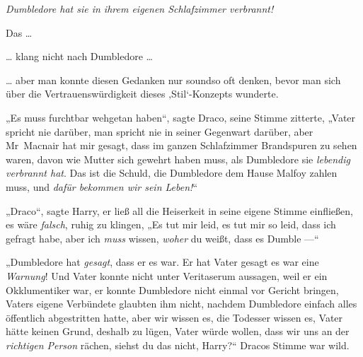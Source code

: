 \emph{Dumbledore hat sie in ihrem eigenen Schlafzimmer verbrannt!}

Das …

… klang nicht nach Dumbledore …

… aber man konnte diesen Gedanken nur soundso oft denken, bevor man sich über die Vertrauenswürdigkeit dieses ‚Stil‘-Konzepts wunderte.

„Es muss furchtbar wehgetan haben“, sagte Draco, seine Stimme zitterte,
„Vater spricht nie darüber, man spricht nie in seiner Gegenwart darüber, aber Mr~Macnair hat mir gesagt, dass im ganzen Schlafzimmer Brandspuren zu sehen waren, davon wie Mutter sich gewehrt haben muss, als Dumbledore sie \emph{lebendig verbrannt hat}. Das ist die Schuld, die Dumbledore dem Hause Malfoy zahlen muss, und \emph{dafür bekommen wir sein Leben!}“

„Draco“, sagte Harry, er ließ all die Heiserkeit in seine eigene Stimme einfließen, es wäre \emph{falsch}, ruhig zu klingen,
„Es tut mir leid, es tut mir so leid, dass ich gefragt habe, aber ich \emph{muss} wissen, \emph{woher} du weißt, dass es Dumble —“

„Dumbledore hat \emph{gesagt}, dass er es war. Er hat Vater gesagt es war eine \emph{Warnung}! Und Vater konnte nicht unter Veritaserum aussagen, weil er ein Okklumentiker war, er konnte Dumbledore nicht einmal vor Gericht bringen, Vaters eigene Verbündete glaubten ihm nicht, nachdem Dumbledore einfach alles öffentlich abgestritten hatte, aber wir wissen es, die Todesser wissen es, Vater hätte keinen Grund, deshalb zu lügen, Vater würde wollen, dass wir uns an der \emph{richtigen Person} rächen, siehst du das nicht, Harry?“ Dracos Stimme war wild.

